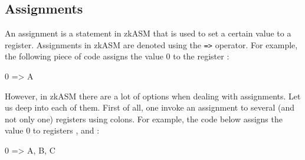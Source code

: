 %
%
%
%
%
%
%
%






\subsection{Assignments} \label{sec:assignments}

An assignment is a statement in zkASM that is used to set a certain value to a register. Assignments in zkASM are denoted using the \texttt{=>} operator. For example, the following piece of code assigns the value $0$ to the register \A:

\begin{zkasm}
0 => A
\end{zkasm}

However, in zkASM there are a lot of options when dealing with assignments. Let us deep into each of them. First of all, one invoke an assignment to several (and not only one) registers using colons. For example, the code below assigns the value $0$ to registers \A, \B and \C:

\begin{zkasm}
0 => A, B, C
\end{zkasm}

